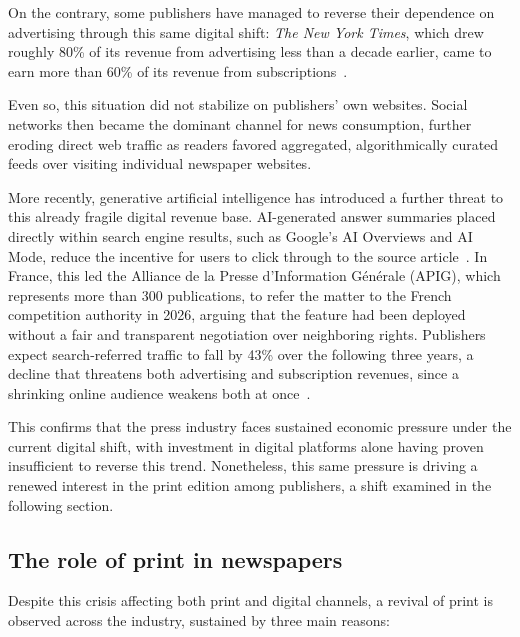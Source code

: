 On the contrary, some publishers have managed to reverse their dependence on advertising through this same digital shift: \emph{The New York Times}, which drew roughly 80\% of its revenue from advertising less than a decade earlier, came to earn more than 60\% of its revenue from subscriptions~\cite{benson-paywalls-2019}.

Even so, this situation did not stabilize on publishers' own websites. Social networks then became the dominant channel for news consumption, further eroding direct web traffic as readers favored aggregated, algorithmically curated feeds over visiting individual newspaper websites. 

More recently, generative artificial intelligence has introduced a further threat to this already fragile digital revenue base. AI-generated answer summaries placed directly within search engine results, such as Google's AI Overviews and AI Mode, reduce the incentive for users to click through to the source article~\cite{lefigaro-apig-ai-overviews-2026}. In France, this led the Alliance de la Presse d'Information Générale (APIG), which represents more than 300 publications, to refer the matter to the French competition authority in 2026, arguing that the feature had been deployed without a fair and transparent negotiation over neighboring rights. Publishers expect search-referred traffic to fall by 43\% over the following three years, a decline that threatens both advertising and subscription revenues, since a shrinking online audience weakens both at once~\cite{lefigaro-apig-ai-overviews-2026}. 



This confirms that the press industry faces sustained economic pressure under the current digital shift, with investment in digital platforms alone having proven insufficient to reverse this trend. Nonetheless, this same pressure is driving a renewed interest in the print edition among publishers, a shift examined in the following section.

\subsection{The role of print in newspapers}

Despite this crisis affecting both print and digital channels, a revival of print is observed across the industry, sustained by three main reasons:

